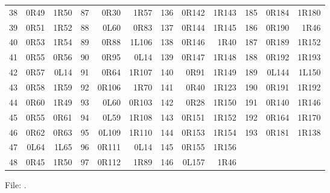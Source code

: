 \begin{center}
\begin{tabular}{rrr@{\hspace{7mm}}rrr@{\hspace{7mm}}rrr@{\hspace{7mm}}rrr}
38 & 0R49 & 1R50 & 87 & 0R30 & 1R57 & 136 & 0R142 & 1R143 & 185 & 0R184 & 1R180 \\
39 & 0R51 & 1R52 & 88 & 0L60 & 0R83 & 137 & 0R144 & 1R145 & 186 & 0R190 & 1R46 \\
40 & 0R53 & 1R54 & 89 & 0R88 & 1L106 & 138 & 0R146 & 1R40 & 187 & 0R189 & 1R152 \\
41 & 0R55 & 0R56 & 90 & 0R95 & 0L14 & 139 & 0R147 & 1R148 & 188 & 0R192 & 1R193 \\
42 & 0R57 & 0L14 & 91 & 0R64 & 1R107 & 140 & 0R91 & 1R149 & 189 & 0L144 & 1L150 \\
43 & 0R58 & 1R59 & 92 & 0R106 & 1R70 & 141 & 0R40 & 1R123 & 190 & 0R191 & 1R192 \\
44 & 0R60 & 1R49 & 93 & 0L60 & 0R103 & 142 & 0R28 & 1R150 & 191 & 0R140 & 1R146 \\
45 & 0R55 & 0R61 & 94 & 0L59 & 1R108 & 143 & 0R151 & 1R152 & 192 & 0R164 & 1R170 \\
46 & 0R62 & 0R63 & 95 & 0L109 & 1R110 & 144 & 0R153 & 1R154 & 193 & 0R181 & 1R138 \\
47 & 0L64 & 1L65 & 96 & 0R111 & 0L14 & 145 & 0R155 & 1R156 &  &  &  \\
48 & 0R45 & 1R50 & 97 & 0R112 & 1R89 & 146 & 0L157 & 1R46 &  &  &  \\
\bottomrule
\end{tabular}
\end{center}
\endgroup
\noindent File: .
\clearpage
